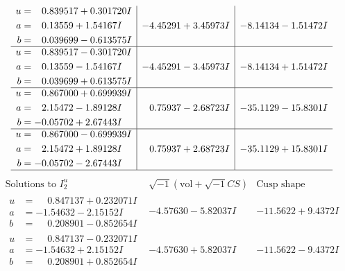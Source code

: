 \documentclass[1p]{elsarticle_modified}
\theoremstyle{definition}
\newcommand{\I}{\sqrt{-1}}
\begin{document}
$$\begin{array}{c|c|c}
\begin{aligned}
u &= \phantom{-}0.839517 + 0.301720 I \\
a &= \phantom{-}0.13559 + 1.54167 I \\
b &= \phantom{-}0.039699 - 0.613575 I\end{aligned}
 & -4.45291 + 3.45973 I & -8.14134 - 1.51472 I \\ \hline\begin{aligned}
u &= \phantom{-}0.839517 - 0.301720 I \\
a &= \phantom{-}0.13559 - 1.54167 I \\
b &= \phantom{-}0.039699 + 0.613575 I\end{aligned}
 & -4.45291 - 3.45973 I & -8.14134 + 1.51472 I \\ \hline\begin{aligned}
u &= \phantom{-}0.867000 + 0.699939 I \\
a &= \phantom{-}2.15472 - 1.89128 I \\
b &= -0.05702 + 2.67443 I\end{aligned}
 & \phantom{-}0.75937 - 2.68723 I & -35.1129 - 15.8301 I \\ \hline\begin{aligned}
u &= \phantom{-}0.867000 - 0.699939 I \\
a &= \phantom{-}2.15472 + 1.89128 I \\
b &= -0.05702 - 2.67443 I\end{aligned}
 & \phantom{-}0.75937 + 2.68723 I & -35.1129 + 15.8301 I\\
 \hline 
 \end{array}$$\newpage$$\begin{array}{c|c|c}  
\text{Solutions to }I^u_{2}& \I (\text{vol} + \sqrt{-1}CS) & \text{Cusp shape}\\
 \hline 
\begin{aligned}
u &= \phantom{-}0.847137 + 0.232071 I \\
a &= -1.54632 - 2.15152 I \\
b &= \phantom{-}0.208901 - 0.852654 I\end{aligned}
 & -4.57630 - 5.82037 I & -11.5622 + 9.4372 I \\ \hline\begin{aligned}
u &= \phantom{-}0.847137 - 0.232071 I \\
a &= -1.54632 + 2.15152 I \\
b &= \phantom{-}0.208901 + 0.852654 I\end{aligned}
 & -4.57630 + 5.82037 I & -11.5622 - 9.4372 I \\ \hline\begin{aligned}

\end{aligned}
\end{array}$$
\end{document}
